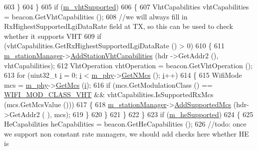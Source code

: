 \begin{DoxyCode}
603                 \}
604             \}
605           \textcolor{keywordflow}{if} (\hyperlink{classns3_1_1RegularWifiMac_a151f330fdeb3f83f9ec7cf07537f0e86}{m\_vhtSupported})
606             \{
607               VhtCapabilities vhtCapabilities = beacon.GetVhtCapabilities ();
608               \textcolor{comment}{//we will always fill in RxHighestSupportedLgiDataRate field at TX, so this can be used to
       check whether it supports VHT}
609               \textcolor{keywordflow}{if} (vhtCapabilities.GetRxHighestSupportedLgiDataRate () > 0)
610                 \{
611                   \hyperlink{classns3_1_1RegularWifiMac_a76d1a5e27b64bfe36f24a55d1eea2775}{m\_stationManager}->\hyperlink{classns3_1_1WifiRemoteStationManager_a52b9e283f99e113cba95afbc2acea72b}{AddStationVhtCapabilities} (hdr
      ->GetAddr2 (), vhtCapabilities);
612                   VhtOperation vhtOperation = beacon.GetVhtOperation ();
613                   \textcolor{keywordflow}{for} (uint32\_t \hyperlink{bernuolliDistribution_8m_a6f6ccfcf58b31cb6412107d9d5281426}{i} = 0; \hyperlink{bernuolliDistribution_8m_a6f6ccfcf58b31cb6412107d9d5281426}{i} < \hyperlink{classns3_1_1RegularWifiMac_a1a6dad8eb0a057a4e1b459f518457a4c}{m\_phy}->\hyperlink{classns3_1_1WifiPhy_aede1b3de380510e387aaafcfda7a0db0}{GetNMcs} (); \hyperlink{bernuolliDistribution_8m_a6f6ccfcf58b31cb6412107d9d5281426}{i}++)
614                     \{
615                       WifiMode mcs = \hyperlink{classns3_1_1RegularWifiMac_a1a6dad8eb0a057a4e1b459f518457a4c}{m\_phy}->\hyperlink{classns3_1_1WifiPhy_a6a8740a6fbb7ff618c80e0a0867467fd}{GetMcs} (\hyperlink{bernuolliDistribution_8m_a6f6ccfcf58b31cb6412107d9d5281426}{i});
616                       \textcolor{keywordflow}{if} (mcs.GetModulationClass () == \hyperlink{namespacens3_aa999e1221606a2b21b1eb33c2007c217a9863e4342bf5c238c74dddfc4d96c67e}{WIFI\_MOD\_CLASS\_VHT} && 
      vhtCapabilities.IsSupportedRxMcs (mcs.GetMcsValue ()))
617                         \{
618                           \hyperlink{classns3_1_1RegularWifiMac_a76d1a5e27b64bfe36f24a55d1eea2775}{m\_stationManager}->\hyperlink{classns3_1_1WifiRemoteStationManager_a4fd51c027afacdfa7225346d6d88c6b3}{AddSupportedMcs} (hdr->GetAddr2 (
      ), mcs);
619                         \}
620                     \}
621                 \}
622             \}
623           \textcolor{keywordflow}{if} (\hyperlink{classns3_1_1RegularWifiMac_a9458143c722fa0b6e5d223d41585842a}{m\_heSupported})
624             \{
625               HeCapabilities heCapabilities = beacon.GetHeCapabilities ();
626               \textcolor{comment}{//todo: once we support non constant rate managers, we should add checks here whether HE is
}
\end{DoxyCode}
